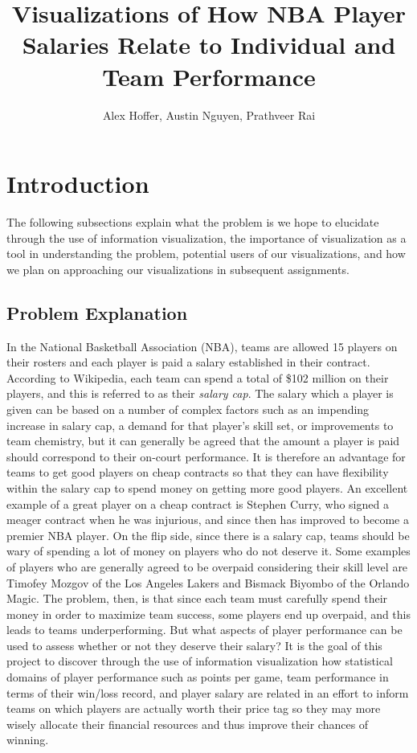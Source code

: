 \documentclass[journal]{vgtc}                %
\title{Visualizations of How NBA Player Salaries Relate to Individual and Team Performance}
\author{Alex Hoffer, Austin Nguyen, Prathveer Rai}
\begin{document}
\maketitle

\section{Introduction}
The following subsections explain what the problem is we hope to elucidate through the use of information visualization, the importance of visualization as a tool in understanding the problem, potential users of our visualizations, and how we plan on approaching our visualizations in subsequent assignments.

\subsection{Problem Explanation}
In the National Basketball Association (NBA), teams are allowed 15 players on their rosters and each player is paid a salary established in their contract. According to Wikipedia, each team can spend a total of \$102 million on their players, and this is referred to as their \emph{salary cap}. The salary which a player is given can be based on a number of complex factors such as an impending increase in salary cap, a demand for that player's skill set, or improvements to team chemistry, but it can generally be agreed that the amount a player is paid should correspond to their on-court performance. It is therefore an advantage for teams to get good players on cheap contracts so that they can have flexibility within the salary cap to spend money on getting more good players. An excellent example of a great player on a cheap contract is Stephen Curry, who signed a meager contract when he was injurious, and since then has improved to become a premier NBA player. On the flip side, since there is a salary cap, teams should be wary of spending a lot of money on players who do not deserve it. Some examples of players who are generally agreed to be overpaid considering their skill level are Timofey Mozgov of the Los Angeles Lakers and Bismack Biyombo of the Orlando Magic. The problem, then, is that since each team must carefully spend their money in order to maximize team success, some players end up overpaid, and this leads to teams underperforming. But what aspects of player performance can be used to assess whether or not they deserve their salary? It is the goal of this project to discover through the use of information visualization how statistical domains of player performance such as points per game, team performance in terms of their win/loss record, and player salary are related in an effort to inform teams on which players are actually worth their price tag so they may more wisely allocate their financial resources and thus improve their chances of winning.  
\end{document}
